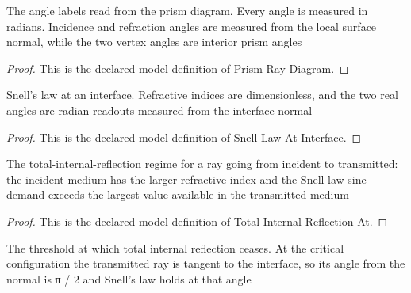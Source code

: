 \begin{definition}
  \label{def:physics:phyx-mini-0019:phyxminiproblems-problemphyxmini0019-prismraydiagram}
  The angle labels read from the prism diagram. Every angle is measured in radians. Incidence and refraction angles are measured from the local surface normal, while the two vertex angles are interior prism angles
\end{definition}
\begin{proof}
  This is the declared model definition of Prism Ray Diagram.
\end{proof}
\begin{definition}
  \label{def:physics:phyx-mini-0019:phyxminiproblems-problemphyxmini0019-snelllawatinterface}
  Snell's law at an interface. Refractive indices are dimensionless, and the two real angles are radian readouts measured from the interface normal
\end{definition}
\begin{proof}
  This is the declared model definition of Snell Law At Interface.
\end{proof}
\begin{definition}
  \label{def:physics:phyx-mini-0019:phyxminiproblems-problemphyxmini0019-totalinternalreflectionat}
  The total-internal-reflection regime for a ray going from incident to transmitted: the incident medium has the larger refractive index and the Snell-law sine demand exceeds the largest value available in the transmitted medium
\end{definition}
\begin{proof}
  This is the declared model definition of Total Internal Reflection At.
\end{proof}
\begin{definition}
  \label{def:physics:phyx-mini-0019:phyxminiproblems-problemphyxmini0019-totalinternalreflectionceasesat}
  The threshold at which total internal reflection ceases. At the critical configuration the transmitted ray is tangent to the interface, so its angle from the normal is π / 2 and Snell's law holds at that angle
\end{definition}
